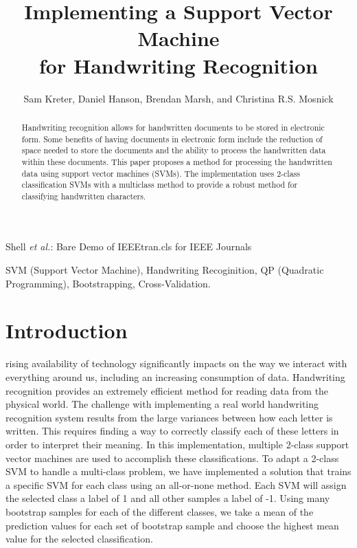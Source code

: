 \documentclass[journal]{IEEEtran}
\begin{document}
\title{Implementing a Support Vector Machine\\ for Handwriting Recognition}


\author{Sam Kreter, Daniel Hanson, Brendan Marsh, and Christina R.S. Mosnick}

{Shell \MakeLowercase{\textit{et al.}}: Bare Demo of IEEEtran.cls for IEEE Journals}

\maketitle

\begin{abstract}
Handwriting recognition allows for handwritten documents to be stored in electronic form. Some benefits of having documents in electronic form include the reduction of space needed to store the documents and the ability to process the handwritten data within these documents. This paper proposes a method for processing the handwritten data using support vector machines (SVMs). The implementation uses 2-class classification SVMs with a multiclass method to provide a robust method for classifying handwritten characters.
\end{abstract}

\begin{IEEEkeywords}
    SVM (Support Vector Machine), Handwriting Recoginition, QP (Quadratic Programming), Bootstrapping, Cross-Validation.
\end{IEEEkeywords}

\IEEEpeerreviewmaketitle

\section{Introduction}

 rising availability of technology significantly impacts on the way we interact with everything around us, including an increasing consumption of data. Handwriting recognition provides an extremely efficient method for reading data from the physical world. The challenge with implementing a real world handwriting recognition system results from the large variances between how each letter is written. This requires finding a way to correctly classify each of these letters in order to interpret their meaning. In this implementation, multiple 2-class support vector machines are used to accomplish these classifications. To adapt a 2-class SVM to handle a multi-class problem, we have implemented a solution that trains a specific SVM for each class using an all-or-none method. Each SVM will assign the selected class a label of 1 and all other samples a label of -1. Using many bootstrap samples for each of the different classes, we take a mean of the prediction values for each set of bootstrap sample and choose the highest mean value for the selected classification.\\
\end{document}
